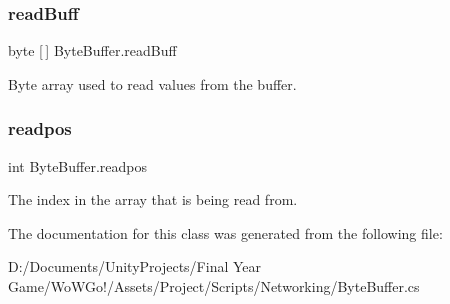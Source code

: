 \subsubsection{\texorpdfstring{readBuff}{readBuff}}
{\footnotesize\ttfamily byte \mbox{[}$\,$\mbox{]} Byte\+Buffer.\+read\+Buff\hspace{0.3cm}{\ttfamily [private]}}



Byte array used to read values from the buffer. 

\mbox{\label{class_byte_buffer_a266fa418f19f51b4929a7d38c8edef3d}} 
\subsubsection{\texorpdfstring{readpos}{readpos}}
{\footnotesize\ttfamily int Byte\+Buffer.\+readpos\hspace{0.3cm}{\ttfamily [private]}}



The index in the array that is being read from. 



The documentation for this class was generated from the following file\+:\begin{DoxyCompactItemize}
\item 
D\+:/\+Documents/\+Unity\+Projects/\+Final Year Game/\+Wo\+W\+Go!/\+Assets/\+Project/\+Scripts/\+Networking/Byte\+Buffer.\+cs\end{DoxyCompactItemize}
